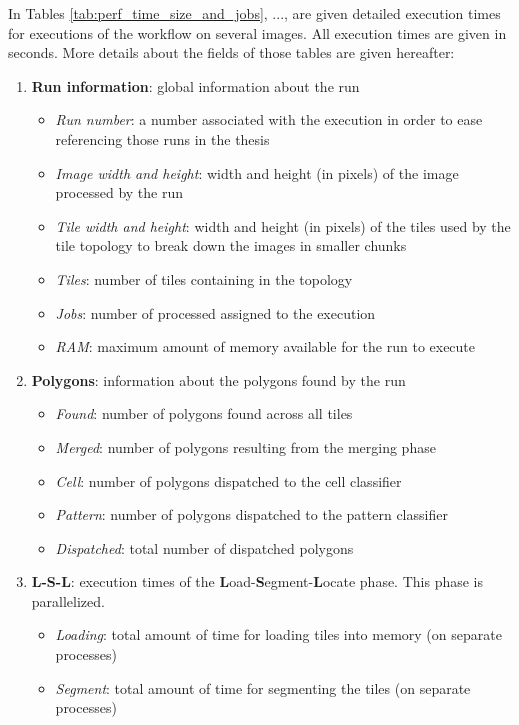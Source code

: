 \label{app:exec_times}
In Tables \ref{tab:perf_time_size_and_jobs}, ..., are given detailed execution times for executions of the workflow on several images. All execution times are given in seconds. More details about the fields of those tables are given hereafter:

\begin{enumerate}
	\item \textbf{Run information}: global information about the run
	\begin{itemize}
		\item \textit{Run number}: a number associated with the execution in order to ease referencing those runs in the thesis
		\item \textit{Image width and height}: width and height (in pixels) of the image processed by the run
		\item \textit{Tile width and height}: width and height (in pixels) of the tiles used by the tile topology to break down the images in smaller chunks
		\item \textit{Tiles}: number of tiles containing in the topology
		\item \textit{Jobs}: number of processed assigned to the execution
		\item \textit{RAM}: maximum amount of memory available for the run to execute
	\end{itemize}
	\item \textbf{Polygons}: information about the polygons found by the run
	\begin{itemize}
		\item \textit{Found}: number of polygons found across all tiles 
		\item \textit{Merged}: number of polygons resulting from the merging phase
		\item \textit{Cell}: number of polygons dispatched to the cell classifier
		\item \textit{Pattern}: number of polygons dispatched to the pattern classifier
		\item \textit{Dispatched}: total number of dispatched polygons
	\end{itemize}
	\item \textbf{L-S-L}: execution times of the \textbf{L}oad-\textbf{S}egment-\textbf{L}ocate phase. This phase is parallelized.
	\begin{itemize}
		\item \textit{Loading}: total amount of time for loading tiles into memory (on separate processes)
		\item \textit{Segment}: total amount of time for segmenting the tiles (on separate processes)

\end{itemize}
\end{enumerate}
